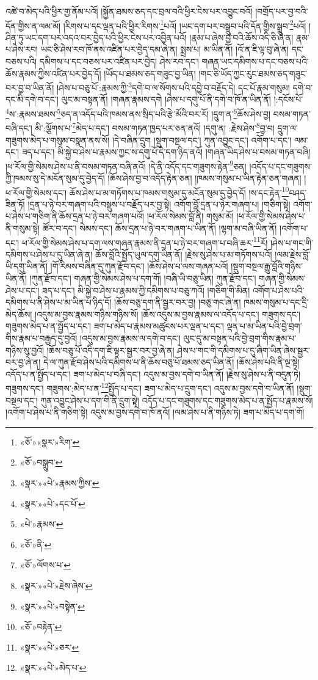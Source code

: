 འཚེ་བ་མེད་པའི་ཕྱིར་གྱ་ནོམ་པའོ། །སྐྱོན་ཐམས་ཅད་དང་བྲལ་བའི་ཕྱིར་ངེས་པར་འབྱུང་བའོ། །བགྲོད་པར་བྱ་བའི་དོན་གྱིས་ན་ལམ་མོ། །རིགས་པ་དང་ལྡན་པའི་ཕྱིར་རིགས་\footnote{«ཅོ་»«སྣར་»རིག་}པའོ། །ཡང་དག་པར་བསྒྲུབ་པའི་དོན་གྱིས་སྒྲུབ་\footnote{«ཅོ་»བསྒྲུབ་}པའོ། །ཤིན་ཏུ་ཡང་དག་པར་འདའ་བར་བྱེད་པའི་ཕྱིར་ངེས་པར་འབྱིན་པའོ། །རྣམ་པ་ཞེས་བྱ་བའི་ཆོས་འདི་ཅི་ཞེ་ན། རྣམ་པ་ཤེས་རབ། ཡང་ཅི་ཤེས་རབ་ཁོ་ནས་འཛིན་པར་བྱེད་དམ་ཞེ་ན། སྨྲས་པ། མ་ཡིན་ནོ། །འོ་ན་ཇི་ལྟ་བུ་ཞེ་ན། དང་བཅས་པའི། དམིགས་པ་དང་བཅས་པར་འཛིན་པར་བྱེད། ཤེས་རབ་དང་། གཞན་ཡང་དམིགས་པ་དང་བཅས་པའི་ཆོས་རྣམས་ཀྱིས་འཛིན་པར་བྱེད་དོ། །ཡོད་པ་ཐམས་ཅད་གཟུང་བྱ་ཡིན། །གང་ཅི་ཡོད་ཀྱང་རུང་ཐམས་ཅད་གཟུང་བར་བྱ་བ་ཡིན་ནོ། །ཤེས་པ་བཅུ་པོ་:རྣམས་ཀྱི་\footnote{«སྣར་»«པེ་»རྣམས་ཀྱིས་}དགེ་བ་ལ་སོགས་པའི་དབྱེ་བ་བརྗོད་དེ། དང་པོ་རྣམ་གསུམ། དགེ་བ་དང་མི་དགེ་བ་དང་། ལུང་མ་བསྟན་ནོ། །གཞན་རྣམས་དགེ །ཤེས་པ་དགུ་པོ་ནི་དགེ་བ་ཁོ་ན་ཡིན་ནོ། །:དངོས་པོ་\footnote{«སྣར་»«པེ་»དང་པོ་}ས་:རྣམས་ཐམས་\footnote{«པེ་»རྣམས་}ཅད་ན་འདོད་པའི་ཁམས་ནས་སྲིད་པའི་རྩེ་མོའི་བར་རོ། །དྲུག་ན་\footnote{«ཅོ་»ནི་}ཆོས་ཤེས་བྱ། བསམ་གཏན་བཞི་དང་། མི་:ལྕོགས་པ་\footnote{«ཅོ་»ལོགས་པ་}མེད་པ་དང་། བསམ་གཏན་ཁྱད་པར་ཅན་ནའོ། །དགུ་ན། :རྗེས་ཤེས་\footnote{«སྣར་»«པེ་»རྗེས་ཞེས་}བྱ་བ། དྲུག་ལ་གཟུགས་མེད་པ་གསུམ་བསྣན་ནས་སོ། །དེ་བཞིན་དྲུག །སྡུག་བསྔལ་དང་། ཀུན་འབྱུང་དང་། འགོག་པ་དང་། ལམ་དང་། ཟད་པ་དང་། མི་སྐྱེ་བ་ཤེས་པ་རྣམས་ཀྱང་ས་དགུ་པོ་དེ་དག་ཉིད་ནའོ། །གཞན་ཡིད་ཤེས་པ་བསམ་གཏན་བཞི། །ཕ་རོལ་གྱི་སེམས་ཤེས་པ་ནི་བསམ་གཏན་བཞི་ནའོ། །དེ་ནི་འདོད་དང་གཟུགས་རྟེན་\footnote{«སྣར་»«པེ་»བསྟེན་}ཅན། །འདོད་པ་དང་གཟུགས་ཀྱི་ཁམས་སུ་དེ་མངོན་སུམ་དུ་བྱེད་དོ། །ཆོས་ཤེས་བྱ་བ་འདོད་རྟེན་ཅན། །ཁམས་གསུམ་པ་ཡིན་རྟེན་ཅན་གཞན། །ཕ་རོལ་གྱི་སེམས་དང་། ཆོས་ཤེས་པ་མ་གཏོགས་པ་ཁམས་གསུམ་དུ་མངོན་སུམ་དུ་བྱེད་དོ། །ས་དང་རྟེན་\footnote{«ཅོ་»བརྟེན་}བཤད་ཟིན་ཏོ། །དྲན་པ་ཉེ་བར་གཞག་པའི་བསྡུས་པ་བརྗོད་པར་བྱ་སྟེ། འགོག་བློ་དྲན་པ་ཉེར་གཞག་པ། །གཅིག་སྟེ། འགོག་པ་ཤེས་པ་གཅིག་ནི་ཆོས་དྲན་པ་ཉེ་བར་གཞག་པའོ། །ཕ་རོལ་སེམས་བློ་ནི། གསུམ་མོ། །ཕ་རོལ་གྱི་སེམས་ཤེས་པ་ནི་གསུམ་སྟེ། ཚོར་བ་དང་། སེམས་དང་། ཆོས་དྲན་པ་ཉེ་བར་གཞག་པ་ཡིན་ནོ། །ལྷག་མ་བཞི་ཡིན་ནོ། །འགོག་པ་དང་། ཕ་རོལ་གྱི་སེམས་ཤེས་པ་དག་ལས་གཞན་རྣམས་ནི་དྲན་པ་ཉེ་བར་གཞག་པ་བཞི་ཆར་\footnote{«སྣར་»«པེ་»ཅར་}རོ། །ཤེས་པ་གང་གི་དམིགས་པ་ཤེས་པ་དུ་ཡིན་ཞེ་ན། ཆོས་བློའི་སྤྱོད་ཡུལ་དགུ་ཡིན་ནོ། །རྗེས་སུ་ཤེས་པ་མ་གཏོགས་པའོ། །ལམ་རྗེས་བློ་ཡི་དགུ་ཡིན་ནོ། །གོ་རིམས་བཞིན་དུ་ཀུན་རྫོབ་དང་། །ཆོས་ཤེས་པ་ལས་གཞན་པའོ། །སྡུག་བསྔལ་རྒྱུ་བློའི་གཉིས་ཡིན་ནོ། །ཀུན་རྫོབ་དང་། གཞན་གྱི་སེམས་ཤེས་པ་དག་གོ། །བཞི་ཡི་བཅུ་ཡིན། ཀུན་རྫོབ་དང་། གཞན་གྱི་སེམས་ཤེས་པ་དང་། ཟད་པ་དང་། མི་སྐྱེ་བ་ཤེས་པ་རྣམས་ཀྱི་དམིགས་པ་བཅུ་ཀའོ། །གཅིག་གི་མིན། འགོག་པ་ཤེས་པའི་དམིགས་པ་ནི་ཤེས་པ་མ་ཡིན་པ་ཉིད་དོ། །ཆོས་བཅུ་དག་ནི་སྦྱར་བར་བྱ། །བཅུ་གང་ཞེ་ན། ཁམས་གསུམ་པ་དང་དྲི་མེད་ཆོས། །འདུས་མ་བྱས་རྣམས་གཉིས་གཉིས་སོ། །ཆོས་འདུས་མ་བྱས་རྣམས་ལ་འདོད་པ་དང་། གཟུགས་དང་། གཟུགས་མེད་པ་ན་སྤྱོད་པ་དང་། ཟག་པ་མེད་པ་རྣམས་མཚུངས་པར་ལྡན་པ་དང་། ལྡན་པ་མ་ཡིན་པའི་བྱེ་བྲག་གིས་རྣམ་པ་བརྒྱད་དུ་བྱའོ། །འདུས་མ་བྱས་རྣམས་ལ་དགེ་བ་དང་། ལུང་དུ་མ་བསྟན་པའི་བྱེ་བྲག་གིས་རྣམ་པ་གཉིས་སུ་བྱའོ། །ཆོས་བཅུ་པོ་འདི་དག་ཇི་ལྟར་སྦྱར་བར་བྱ་ཞེ་ན། ཤེས་པ་གང་གི་དམིགས་པ་དུ་ཞིག་ཡིན་ཞེས་སྦྱར་བར་བྱ་ཞེ་ན། དེ་ལ་ཀུན་རྫོབ་ཤེས་པའི་དམིགས་པ་ནི་ཆོས་བཅུ་པོ་ཐམས་ཅད་ཡིན་ནོ། །ཆོས་ཤེས་པའི་ནི་ལྔ་སྟེ། འདོད་པ་ན་སྤྱོད་པ་དང་། ཟག་པ་མེད་པ་བཞི་དང་། འདུས་མ་བྱས་དགེ་བ་ཡིན་ནོ། །རྗེས་སུ་ཤེས་པ་ནི་བདུན་ཏེ། གཟུགས་དང་། གཟུགས་:མེད་པ་ན་\footnote{«སྣར་»«པེ་»མེད་པ་}སྤྱོད་པ་དང་། ཟག་པ་མེད་པ་དྲུག་དང་། འདུས་མ་བྱས་དགེ་བ་ཡིན་ནོ། །སྡུག་བསྔལ་དང་། ཀུན་འབྱུང་ཤེས་པ་དག་གི་ནི་དྲུག་སྟེ། འདོད་པ་དང་གཟུགས་དང་གཟུགས་མེད་པ་ན་སྤྱོད་པ་རྣམས་སོ། །འགོག་པ་ཤེས་པ་ནི་གཅིག་སྟེ། འདུས་མ་བྱས་དགེ་བ་ཁོ་ནའོ། །ལམ་ཤེས་པ་ནི་གཉིས་ཏེ། ཟག་པ་མེད་པ་དག་གོ། 